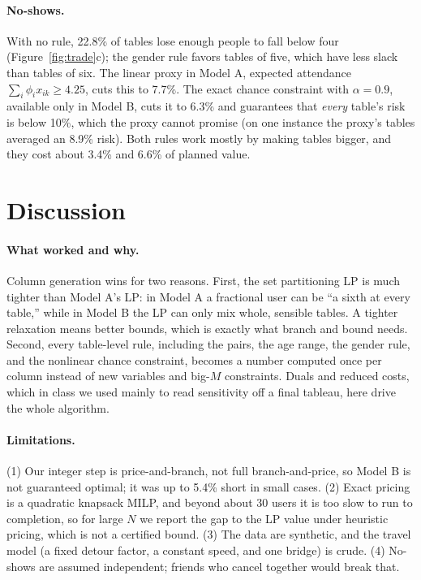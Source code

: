 \paragraph{No-shows.} With no rule, 22.8\% of tables lose enough people to fall below four (Figure~\ref{fig:trade}c); the gender rule favors tables of five, which have less slack than tables of six. The linear proxy in Model A, expected attendance $\sum_i\phi_i x_{ik}\ge 4.25$, cuts this to 7.7\%. The exact chance constraint with $\alpha=0.9$, available only in Model B, cuts it to 6.3\% and guarantees that \emph{every} table's risk is below 10\%, which the proxy cannot promise (on one instance the proxy's tables averaged an 8.9\% risk). Both rules work mostly by making tables bigger, and they cost about 3.4\% and 6.6\% of planned value.

\section{Discussion}
\label{sec:discussion}

\paragraph{What worked and why.} Column generation wins for two reasons. First, the set partitioning LP is much tighter than Model A's LP: in Model A a fractional user can be ``a sixth at every table,'' while in Model B the LP can only mix whole, sensible tables. A tighter relaxation means better bounds, which is exactly what branch and bound needs. Second, every table-level rule, including the pairs, the age range, the gender rule, and the nonlinear chance constraint, becomes a number computed once per column instead of new variables and big-$M$ constraints. Duals and reduced costs, which in class we used mainly to read sensitivity off a final tableau, here drive the whole algorithm.

\paragraph{Limitations.} (1) Our integer step is price-and-branch, not full branch-and-price, so Model B is not guaranteed optimal; it was up to 5.4\% short in small cases. (2) Exact pricing is a quadratic knapsack MILP, and beyond about 30 users it is too slow to run to completion, so for large $N$ we report the gap to the LP value under heuristic pricing, which is not a certified bound. (3) The data are synthetic, and the travel model (a fixed detour factor, a constant speed, and one bridge) is crude. (4) No-shows are assumed independent; friends who cancel together would break that.


